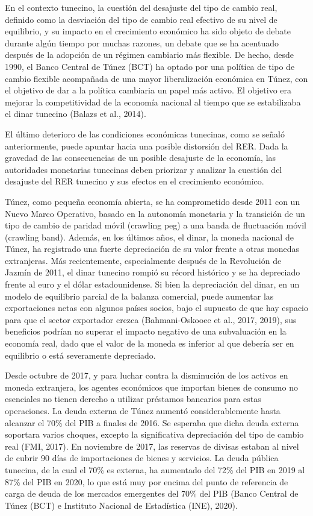 \documentclass[11pt,a4paper]{article}
\begin{document}
En el contexto tunecino, la cuestión del desajuste del tipo de cambio real, definido como la desviación del tipo de cambio real efectivo de su nivel de equilibrio, y su impacto en el crecimiento económico ha sido objeto de debate durante algún tiempo por muchas razones, un debate que se ha acentuado después de la adopción de un régimen cambiario más flexible. De hecho, desde 1990, el Banco Central de Túnez (BCT) ha optado por una política de tipo de cambio flexible acompañada de una mayor liberalización económica en Túnez, con el objetivo de dar a la política cambiaria un papel más activo. El objetivo era mejorar la competitividad de la economía nacional al tiempo que se estabilizaba el dinar tunecino (Balazs et al., 2014).

El último deterioro de las condiciones económicas tunecinas, como se señaló anteriormente, puede apuntar hacia una posible distorsión del RER. Dada la gravedad de las consecuencias de un posible desajuste de la economía, las autoridades monetarias tunecinas deben priorizar y analizar la cuestión del desajuste del RER tunecino y sus efectos en el crecimiento económico.

Túnez, como pequeña economía abierta, se ha comprometido desde 2011 con un Nuevo Marco Operativo, basado en la autonomía monetaria y la transición de un tipo de cambio de paridad móvil (crawling peg) a una banda de fluctuación móvil (crawling band). Además, en los últimos años, el dinar, la moneda nacional de Túnez, ha registrado una fuerte depreciación de su valor frente a otras monedas extranjeras. Más recientemente, especialmente después de la Revolución de Jazmín de 2011, el dinar tunecino rompió su récord histórico y se ha depreciado frente al euro y el dólar estadounidense. Si bien la depreciación del dinar, en un modelo de equilibrio parcial de la balanza comercial, puede aumentar las exportaciones netas con algunos países socios, bajo el supuesto de que hay espacio para que el sector exportador crezca (Bahmani-Oskooee et al., 2017, 2019), sus beneficios podrían no superar el impacto negativo de una subvaluación en la economía real, dado que el valor de la moneda es inferior al que debería ser en equilibrio o está severamente depreciado.

Desde octubre de 2017, y para luchar contra la disminución de los activos en moneda extranjera, los agentes económicos que importan bienes de consumo no esenciales no tienen derecho a utilizar préstamos bancarios para estas operaciones. La deuda externa de Túnez aumentó considerablemente hasta alcanzar el 70\% del PIB a finales de 2016. Se esperaba que dicha deuda externa soportara varios choques, excepto la significativa depreciación del tipo de cambio real (FMI, 2017). En noviembre de 2017, las reservas de divisas estaban al nivel de cubrir 90 días de importaciones de bienes y servicios. La deuda pública tunecina, de la cual el 70\% es externa, ha aumentado del 72\% del PIB en 2019 al 87\% del PIB en 2020, lo que está muy por encima del punto de referencia de carga de deuda de los mercados emergentes del 70\% del PIB (Banco Central de Túnez (BCT) e Instituto Nacional de Estadística (INE), 2020).
\end{document}
